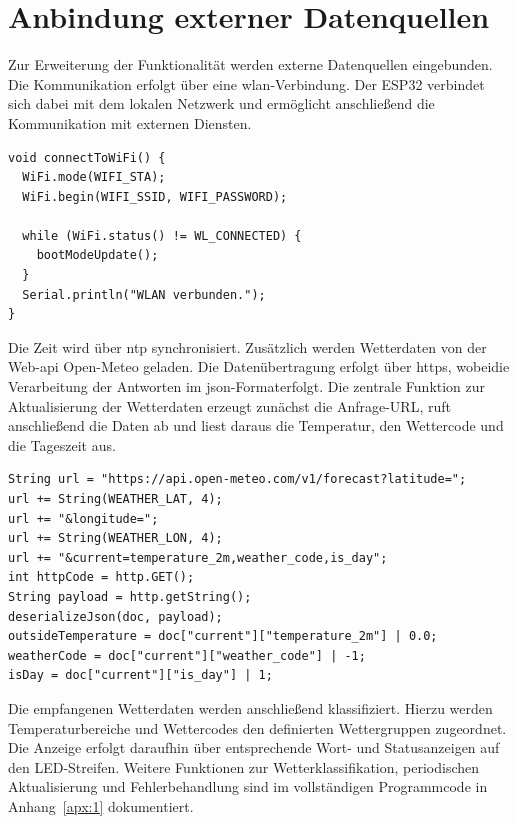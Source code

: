 \section{Anbindung externer Datenquellen}
Zur Erweiterung der Funktionalität werden externe Datenquellen eingebunden.  
Die Kommunikation erfolgt über eine \gls{wlan}-Verbindung.  
Der ESP32 verbindet sich dabei mit dem lokalen Netzwerk und ermöglicht anschließend die Kommunikation mit externen Diensten.

\begin{lstlisting}[style=arduino,caption={Funktion zum Verbindungsaufbau mit dem \gls{wifi}-Access-Point.}]
void connectToWiFi() {
  WiFi.mode(WIFI_STA);
  WiFi.begin(WIFI_SSID, WIFI_PASSWORD);

  while (WiFi.status() != WL_CONNECTED) {
    bootModeUpdate();
  }
  Serial.println("WLAN verbunden.");
}
\end{lstlisting}

Die Zeit wird über \gls{ntp} synchronisiert.  
Zusätzlich werden Wetterdaten von der Web-\gls{api} Open-Meteo geladen.  
Die Datenübertragung erfolgt über \gls{https}, wobeidie Verarbeitung der Antworten im \gls{json}-Formaterfolgt.
Die zentrale Funktion zur Aktualisierung der Wetterdaten erzeugt zunächst die Anfrage-URL, ruft anschließend die Daten ab und liest daraus die Temperatur, den Wettercode und die Tageszeit aus.

\begin{lstlisting}[style=arduino,caption={Auszug aus der Wetterdatenabfrage.}]
String url = "https://api.open-meteo.com/v1/forecast?latitude=";
url += String(WEATHER_LAT, 4);
url += "&longitude=";
url += String(WEATHER_LON, 4);
url += "&current=temperature_2m,weather_code,is_day";
int httpCode = http.GET();
String payload = http.getString();
deserializeJson(doc, payload);
outsideTemperature = doc["current"]["temperature_2m"] | 0.0;
weatherCode = doc["current"]["weather_code"] | -1;
isDay = doc["current"]["is_day"] | 1;
\end{lstlisting}

Die empfangenen Wetterdaten werden anschließend klassifiziert.  
Hierzu werden Temperaturbereiche und Wettercodes den definierten Wettergruppen zugeordnet.
Die Anzeige erfolgt daraufhin über entsprechende Wort- und Statusanzeigen auf den LED-Streifen.
Weitere Funktionen zur Wetterklassifikation, periodischen Aktualisierung und Fehlerbehandlung sind im vollständigen Programmcode in Anhang~\ref{apx:1} dokumentiert.